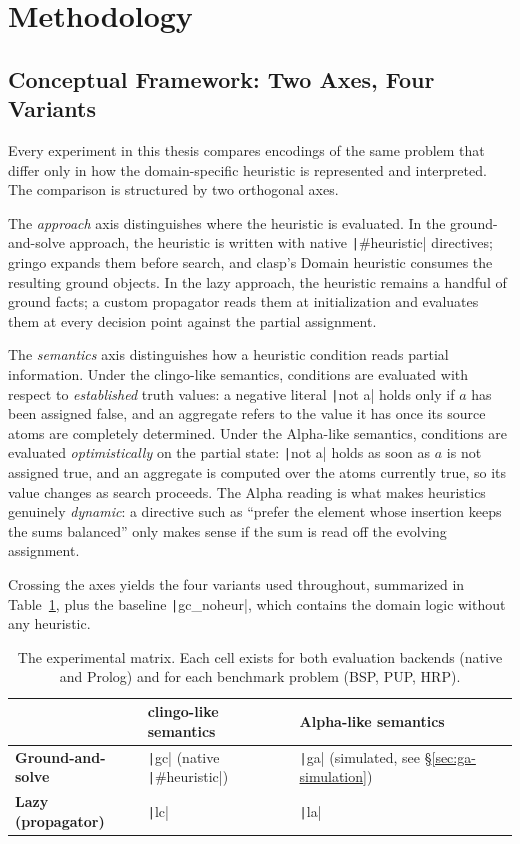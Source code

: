 \section{Methodology}

\subsection{Conceptual Framework: Two Axes, Four Variants}

Every experiment in this thesis compares encodings of the same problem that differ only in how the domain-specific heuristic is represented and interpreted. The comparison is structured by two orthogonal axes.

The \emph{approach} axis distinguishes where the heuristic is evaluated. In the ground-and-solve approach, the heuristic is written with native \texttt|#heuristic| directives; gringo expands them before search, and clasp's Domain heuristic consumes the resulting ground objects. In the lazy approach, the heuristic remains a handful of ground facts; a custom propagator reads them at initialization and evaluates them at every decision point against the partial assignment.

The \emph{semantics} axis distinguishes how a heuristic condition reads partial information. Under the clingo-like semantics, conditions are evaluated with respect to \emph{established} truth values: a negative literal \texttt|not a| holds only if $a$ has been assigned false, and an aggregate refers to the value it has once its source atoms are completely determined. Under the Alpha-like semantics, conditions are evaluated \emph{optimistically} on the partial state: \texttt|not a| holds as soon as $a$ is not assigned true, and an aggregate is computed over the atoms currently true, so its value changes as search proceeds. The Alpha reading is what makes heuristics genuinely \emph{dynamic}: a directive such as \enquote{prefer the element whose insertion keeps the sums balanced} only makes sense if the sum is read off the evolving assignment.

Crossing the axes yields the four variants used throughout, summarized in Table~\ref{tab:variant-matrix}, plus the baseline \texttt|gc_noheur|, which contains the domain logic without any heuristic.

\begin{table}[H]
\centering
\begin{tabular}{lll}
\toprule
 & \textbf{clingo-like semantics} & \textbf{Alpha-like semantics}\\
\midrule
\textbf{Ground-and-solve} & \texttt|gc| (native \texttt|#heuristic|) & \texttt|ga| (simulated, see \S\ref{sec:ga-simulation})\\
\textbf{Lazy (propagator)} & \texttt|lc| & \texttt|la|\\
\bottomrule
\end{tabular}
\caption{The experimental matrix. Each cell exists for both evaluation backends (native and Prolog) and for each benchmark problem (BSP, PUP, HRP).}
\label{tab:variant-matrix}
\end{table}

